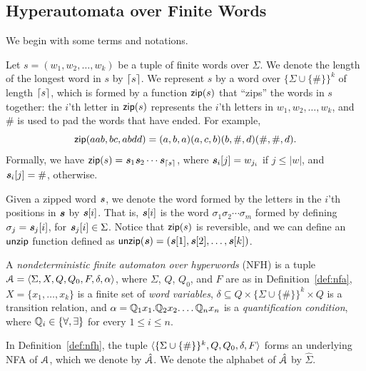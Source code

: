 \subsection{Hyperautomata over Finite Words}
\label{sec:haf}

We begin with some terms and notations. 

Let $s = (w_1,w_2,\ldots, w_k)$ be a tuple of finite words over  $\Sigma$. We 
denote the length of the longest word in $s$ by $\lceil s \rceil$. We represent $s$ by 
a word over $\{\Sigma\cup\{\#\}\}^k$ of length $\lceil s \rceil$, which is 
formed by a function $\mathsf{zip}(s)$ that ``zips'' the words in $s$ together: the 
$i$'th letter in $\mathsf{zip}(s)$ represents the $i$'th letters in $w_1, w_2, \ldots, 
w_k$, 
and $\#$ is used to pad the words that have ended. For example,
%
$$\mathsf{zip}(aab, bc, abdd) = (a, b, a)(a, c, b)(b, \#, d)(\#, \#, d).$$
%
Formally, we have $\mathsf{zip}(s) =  \textbf{\textit s}_1\textbf{\textit s}_2\cdots \textbf{\textit s}_{\lceil s \rceil}$, 
where
$\textbf{\textit s}_i[j] = w_{j_i}$ if $j\leq|w|$, and $\textbf{\textit s}_i[j] = \#$, otherwise.

Given a zipped word $\textbf{\textit s}$, we denote the word formed by the letters in the 
$i$'th positions in $\textbf{\textit s}$ by $\textbf{\textit s}[i]$. 
That is, $\textbf{\textit s}[i]$ is the word $\sigma_1\sigma_2\cdots \sigma_m$ formed by 
defining $\sigma_j = \textbf{\textit s}_j[i]$, for $\textbf{\textit s}_j[i]\in \Sigma$.
Notice that $\mathsf{zip}(s)$ is reversible, and we can define an $\mathsf{unzip}$ function 
defined as $\mathsf{unzip}(\textbf{\textit s}) = (\textbf{\textit s}[1],\textbf{\textit s}[2],\dots, \textbf{\textit s}[k])$.

\begin{definition}
\label{def:nfh}
A {\em nondeterministic finite automaton over hyperwords} (NFH) is a tuple
$\mathcal{A} = \langle \Sigma,X,Q,Q_0,F,\delta,\alpha \rangle$, where $\Sigma$, $Q$, $Q_0$, and $F$ are as in Definition~\ref{def:nfa}, $X=\{x_1,\dots, x_k\}$ is a finite set of {\em word variables}, 
$\delta\subseteq Q\times \{\Sigma\cup \{\#\}\}^k \times Q$ is a transition 
relation, and $\alpha  = \mathbb{Q}_1 x_1.\mathbb{Q}_2x_2.\ldots \mathbb{Q}_nx_n$ is a {\em 
quantification condition}, where $\mathbb{Q}_i\in\{\forall,\exists\}$ for every 
$1\leq i\leq n$.

\end{definition}
%
In Definition~\ref{def:nfh}, the tuple $\langle \{\Sigma\cup \{\#\}\} ^k, Q, 
Q_0, \delta, F \rangle$ forms an underlying NFA of $\mathcal{A}$, which we denote by 
$\hat{\mathcal{A}}$. We denote the alphabet of $\hat{\mathcal{A}}$ by $\hat{\Sigma}$. 

